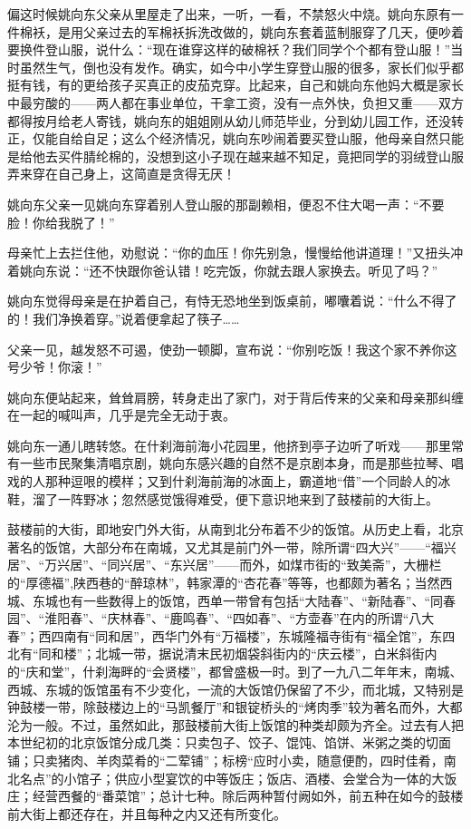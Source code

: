 \par 偏这时候姚向东父亲从里屋走了出来，一听，一看，不禁怒火中烧。姚向东原有一件棉袄，是用父亲过去的军棉袄拆洗改做的，姚向东套着蓝制服穿了几天，便吵着要换件登山服，说什么：“现在谁穿这样的破棉袄？我们同学个个都有登山服！”当时虽然生气，倒也没有发作。确实，如今中小学生穿登山服的很多，家长们似乎都挺有钱，有的更给孩子买真正的皮茄克穿。比起来，自己和姚向东他妈大概是家长中最穷酸的——两人都在事业单位，干拿工资，没有一点外快，负担又重——双方都得按月给老人寄钱，姚向东的姐姐刚从幼儿师范毕业，分到幼儿园工作，还没转正，仅能自给自足；这么个经济情况，姚向东吵闹着要买登山服，他母亲自然只能是给他去买件腈纶棉的，没想到这小子现在越来越不知足，竟把同学的羽绒登山服弄来穿在自己身上，这简直是贪得无厌！
\par 姚向东父亲一见姚向东穿着别人登山服的那副赖相，便忍不住大喝一声：“不要脸！你给我脱了！”
\par 母亲忙上去拦住他，劝慰说：“你的血压！你先别急，慢慢给他讲道理！”又扭头冲着姚向东说：“还不快跟你爸认错！吃完饭，你就去跟人家换去。听见了吗？”
\par 姚向东觉得母亲是在护着自己，有恃无恐地坐到饭桌前，嘟囔着说：“什么不得了的！我们净换着穿。”说着便拿起了筷子……
\par 父亲一见，越发怒不可遏，使劲一顿脚，宣布说：“你别吃饭！我这个家不养你这号少爷！你滚！”
\par 姚向东便站起来，耸耸肩膀，转身走出了家门，对于背后传来的父亲和母亲那纠缠在一起的喊叫声，几乎是完全无动于衷。
\par 姚向东一通儿瞎转悠。在什刹海前海小花园里，他挤到亭子边听了听戏——那里常有一些市民聚集清唱京剧，姚向东感兴趣的自然不是京剧本身，而是那些拉琴、唱戏的人那种逗哏的模样；又到什刹海前海的冰面上，霸道地“借”一个同龄人的冰鞋，溜了一阵野冰；忽然感觉饿得难受，便下意识地来到了鼓楼前的大街上。
\par 鼓楼前的大街，即地安门外大街，从南到北分布着不少的饭馆。从历史上看，北京著名的饭馆，大部分布在南城，又尤其是前门外一带，除所谓“四大兴”——“福兴居”、“万兴居”、“同兴居”、“东兴居”——而外，如煤市街的“致美斋”，大栅栏的“厚德福”,陕西巷的“醉琼林”，韩家潭的“杏花春”等等，也都颇为著名；当然西城、东城也有一些数得上的饭馆，西单一带曾有包括“大陆春”、“新陆春”、“同春园”、“淮阳春”、“庆林春”、“鹿鸣春”、“四如春”、“方壶春”在内的所谓“八大春”；西四南有“同和居”，西华门外有“万福楼”，东城隆福寺街有“福全馆”，东四北有“同和楼”；北城一带，据说清末民初烟袋斜街内的“庆云楼”，白米斜街内的“庆和堂”，什刹海畔的“会贤楼”，都曾盛极一时。到了一九八二年年末，南城、西城、东城的饭馆虽有不少变化，一流的大饭馆仍保留了不少，而北城，又特别是钟鼓楼一带，除鼓楼边上的“马凯餐厅”和银锭桥头的“烤肉季”较为著名而外，大都沦为一般。不过，虽然如此，那鼓楼前大街上饭馆的种类却颇为齐全。过去有人把本世纪初的北京饭馆分成几类：只卖包子、饺子、馄饨、馅饼、米粥之类的切面铺；只卖猪肉、羊肉菜肴的“二荤铺”；标榜“应时小卖，随意便酌，四时佳肴，南北名点”的小馆子；供应小型宴饮的中等饭庄；饭店、酒楼、会堂合为一体的大饭庄；经营西餐的“番菜馆”；总计七种。除后两种暂付阙如外，前五种在如今的鼓楼前大街上都还存在，并且每种之内又还有所变化。
